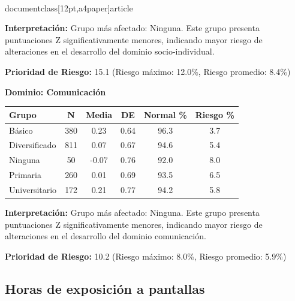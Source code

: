 \\documentclass[12pt,a4paper]{article}
\begin{document}
\textbf{Interpretación:} Grupo más afectado: Ninguna. Este grupo presenta puntuaciones Z significativamente menores, indicando mayor riesgo de alteraciones en el desarrollo del dominio socio-individual.

\textbf{Prioridad de Riesgo:} 15.1 (Riesgo máximo: 12.0\%, Riesgo promedio: 8.4\%)


\vspace{0.5cm}


\textbf{Dominio: Comunicación}


\begin{center}
\begin{tabular}{|l|c|c|c|c|c|}
\hline
\textbf{Grupo} & \textbf{N} & \textbf{Media} & \textbf{DE} & \textbf{Normal \%} & \textbf{Riesgo \%} \\
\hline
Básico & 380 & 0.23 & 0.64 & 96.3 & 3.7 \\
Diversificado & 811 & 0.07 & 0.67 & 94.6 & 5.4 \\
Ninguna & 50 & -0.07 & 0.76 & 92.0 & 8.0 \\
Primaria & 260 & 0.01 & 0.69 & 93.5 & 6.5 \\
Universitario & 172 & 0.21 & 0.77 & 94.2 & 5.8 \\

\hline
\end{tabular}
\end{center}


\textbf{Interpretación:} Grupo más afectado: Ninguna. Este grupo presenta puntuaciones Z significativamente menores, indicando mayor riesgo de alteraciones en el desarrollo del dominio comunicación.

\textbf{Prioridad de Riesgo:} 10.2 (Riesgo máximo: 8.0\%, Riesgo promedio: 5.9\%)


\vspace{0.5cm}


\subsection{Horas de exposición a pantallas}
\end{document}
